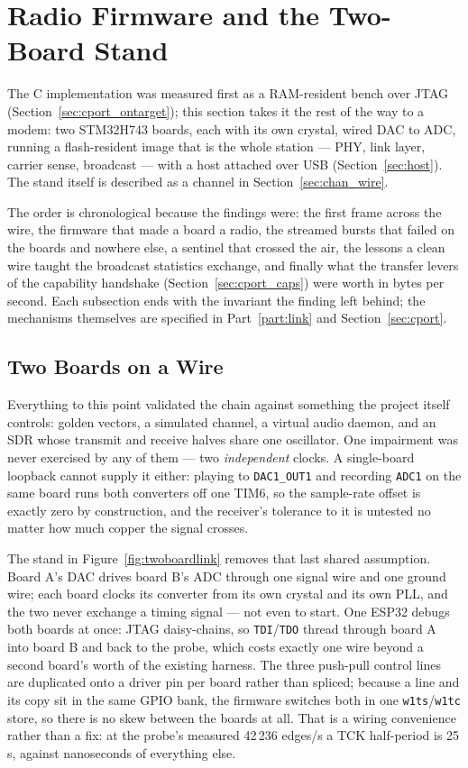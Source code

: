 \section{Radio Firmware and the Two-Board Stand}
\label{sec:radio}

The C implementation was measured first as a RAM-resident bench over
JTAG (Section~\ref{sec:cport_ontarget}); this section takes it the rest
of the way to a modem: two STM32H743 boards, each with its own crystal,
wired DAC to ADC, running a flash-resident image that is the whole
station --- PHY, link layer, carrier sense, broadcast --- with a host
attached over USB (Section~\ref{sec:host}).  The stand itself is
described as a channel in Section~\ref{sec:chan_wire}.

The order is chronological because the findings were: the first frame
across the wire, the firmware that made a board a radio, the streamed
bursts that failed on the boards and nowhere else, a sentinel that
crossed the air, the lessons a clean wire taught the broadcast
statistics exchange, and finally what the transfer levers of the
capability handshake (Section~\ref{sec:cport_caps}) were worth in
bytes per second.  Each subsection ends with the invariant the finding
left behind; the mechanisms themselves are specified in
Part~\ref{part:link} and Section~\ref{sec:cport}.

\subsection{Two Boards on a Wire}
\label{sec:cport_twoboard}

Everything to this point validated the chain against something the
project itself controls: golden vectors, a simulated channel, a virtual
audio daemon, and an SDR whose transmit and receive halves share one
oscillator. One impairment was never exercised by any of them --- two
\emph{independent} clocks. A single-board loopback cannot supply it
either: playing to \texttt{DAC1\_OUT1} and recording \texttt{ADC1} on
the same board runs both converters off one TIM6, so the sample-rate
offset is exactly zero by construction, and the receiver's tolerance to
it is untested no matter how much copper the signal crosses.

The stand in Figure~\ref{fig:twoboardlink} removes that last shared
assumption. Board A's DAC drives board B's ADC through one signal wire
and one ground wire; each board clocks its converter from its own
crystal and its own PLL, and the two never exchange a timing signal ---
not even to start. One ESP32 debugs both boards at once: JTAG
daisy-chains, so \texttt{TDI}/\texttt{TDO} thread through board A into
board B and back to the probe, which costs exactly one wire beyond a
second board's worth of the existing harness. The three push-pull
control lines are duplicated onto a driver pin per board rather than
spliced; because a line and its copy sit in the same GPIO bank, the
firmware switches both in one \texttt{w1ts}/\texttt{w1tc} store, so
there is no skew between the boards at all. That is a wiring
convenience rather than a fix: at the probe's measured 42\,236 edges/s
a TCK half-period is 25\,\textmu s, against nanoseconds of everything
else.

